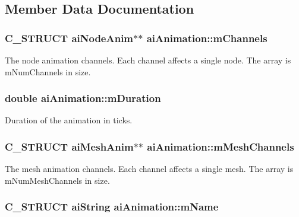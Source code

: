 \subsection{\-Member \-Data \-Documentation}
\hypertarget{structaiAnimation_a89244bb68b725ffbb85137174c28e757}{
\subsubsection[{m\-Channels}]{\setlength{\rightskip}{0pt plus 5cm}\-C\-\_\-\-S\-T\-R\-U\-C\-T {\bf ai\-Node\-Anim}$\ast$$\ast$ {\bf ai\-Animation\-::m\-Channels}}}\label{structaiAnimation_a89244bb68b725ffbb85137174c28e757}
\-The node animation channels. \-Each channel affects a single node. \-The array is m\-Num\-Channels in size. \hypertarget{structaiAnimation_ae2bbc49320b4b75c05e23e0ab704ece7}{
\subsubsection[{m\-Duration}]{\setlength{\rightskip}{0pt plus 5cm}double {\bf ai\-Animation\-::m\-Duration}}}\label{structaiAnimation_ae2bbc49320b4b75c05e23e0ab704ece7}
\-Duration of the animation in ticks. \hypertarget{structaiAnimation_af05138121dbde8b31aa031505b454c85}{
\subsubsection[{m\-Mesh\-Channels}]{\setlength{\rightskip}{0pt plus 5cm}\-C\-\_\-\-S\-T\-R\-U\-C\-T {\bf ai\-Mesh\-Anim}$\ast$$\ast$ {\bf ai\-Animation\-::m\-Mesh\-Channels}}}\label{structaiAnimation_af05138121dbde8b31aa031505b454c85}
\-The mesh animation channels. \-Each channel affects a single mesh. \-The array is m\-Num\-Mesh\-Channels in size. \hypertarget{structaiAnimation_a1be7d78d88694173a7ceef658fea77f1}{
\subsubsection[{m\-Name}]{\setlength{\rightskip}{0pt plus 5cm}\-C\-\_\-\-S\-T\-R\-U\-C\-T {\bf ai\-String} {\bf ai\-Animation\-::m\-Name}}}\label{structaiAnimation_a1be7d78d88694173a7ceef658fea77f1}

